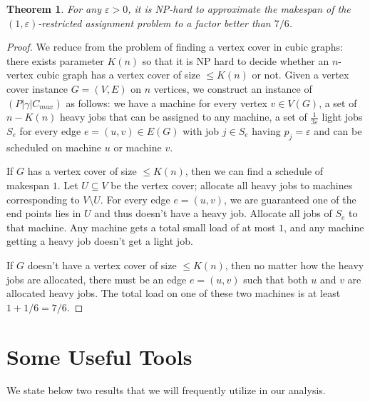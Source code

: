 \documentclass[11pt]{article}
\newtheorem{theorem}{Theorem} \newtheorem{lemma}{Lemma}[section]
\newcommand{\eps}{\varepsilon}
\renewcommand{\epsilon}{\varepsilon}
\renewcommand{\epsilon}{\varepsilon}
\begin{document}
\begin{theorem}\label{thm:3}
For any $\epsilon> 0$, 
it is NP-hard to approximate the makespan of the $(1,\epsilon)$-restricted assignment problem to a factor better than $7/6$.
\end{theorem}
\begin{proof}
We reduce from the problem of finding a vertex cover in cubic graphs: there exists parameter $K(n)$ so that it is NP hard to decide whether an $n$-vertex cubic graph has a vertex cover of size $\le K(n)$ or not.
Given a vertex cover instance $G=(V,E)$ on $n$ vertices, we construct an instance of $(P|\gamma|C_{max})$ as follows: we have a machine for every vertex $v\in V(G)$, a set of $n - K(n)$ heavy jobs that can be assigned to any machine,
a set of $\frac{1}{3\eps}$ light jobs $S_e$ for every edge $e=(u,v)\in E(G)$ with job $j\in S_e$ having
$p_j = \eps$ and can be scheduled on machine $u$ or machine $v$.

If $G$ has a vertex cover of size $\le K(n)$, then we can find a schedule of makespan $1$. 
Let $U\subseteq V$ be the vertex cover; allocate all heavy jobs to machines corresponding to $V\setminus U$. For every edge $e = (u,v)$, we are guaranteed one of the end points lies in $U$ and thus doesn't have a heavy job. Allocate all jobs of $S_e$ to that machine. Any machine gets a total small load of at most $1$, and any machine getting a heavy job doesn't get a light job. 

If $G$ doesn't have a vertex cover of size $\le K(n)$, then no matter how the heavy jobs are allocated, there must be an edge $e = (u,v)$ such that both $u$ and $v$ are allocated heavy jobs. The total load on one of these two machines is at least $1 + 1/6 = 7/6$.
\end{proof}

\section{Some Useful Tools}\label{app:useful-tools}
We state below two results that we will frequently utilize in our analysis. 
\end{document}

